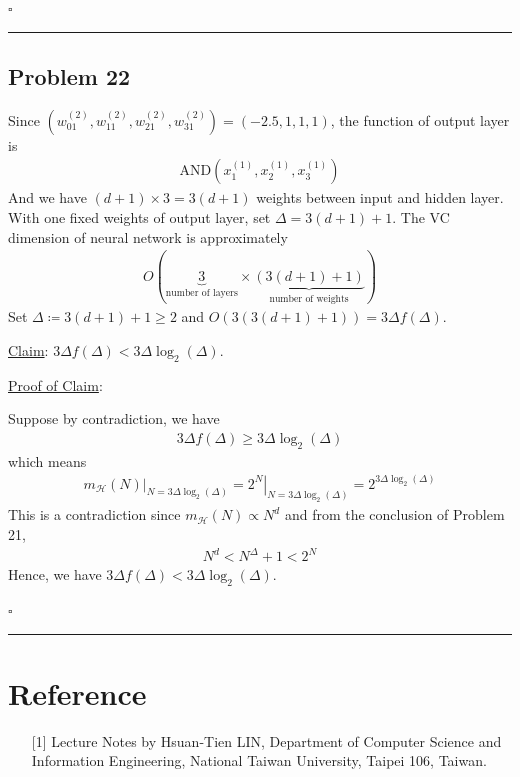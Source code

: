 \documentclass[12pt]{article}
\newcommand*{\QEDB}{\hfill\ensuremath{\square}}
\newcommand{\ParTh}[1]{\left(#1\right)}
\newcommand{\horrule}[1]{\rule{\linewidth}{#1}}
\begin{document}

\QEDB

\horrule{0.5pt}

\subsection*{Problem 22}

Since $\ParTh{w^{\ParTh{2}}_{01},w^{\ParTh{2}}_{11},w^{\ParTh{2}}_{21},w^{\ParTh{2}}_{31}}=\ParTh{-2.5,1,1,1}$, the function of output layer is
\begin{align}
\text{AND}\ParTh{x^{\ParTh{1}}_1,x^{\ParTh{1}}_2,x^{\ParTh{1}}_3}
\end{align}
And we have $\ParTh{d+1}\times3=3\ParTh{d+1}$ weights between input and hidden layer. With one fixed weights of output layer, set $\Delta=3\ParTh{d+1}+1$. The VC dimension of neural network is approximately
\begin{align}
O\ParTh{\underbrace{3}_{\text{number of layers}}\times\underbrace{\ParTh{3\ParTh{d+1}+1}}_{\text{number of weights}}}
\end{align}
Set $\Delta\coloneqq3\ParTh{d+1}+1\geq2$ and $O\ParTh{3\ParTh{3\ParTh{d+1}+1}}=3\Delta f\ParTh{\Delta}$.

\underline{Claim}: $3\Delta f\ParTh{\Delta}<3\Delta\log_2\ParTh{\Delta}$.

\underline{Proof of Claim}:

Suppose by contradiction, we have
\begin{align}
3\Delta f\ParTh{\Delta}\geq3\Delta\log_2\ParTh{\Delta}
\end{align}
which means
\begin{align}
\left.m_{\mathcal{H}}\ParTh{N}\right|_{N=3\Delta\log_2\ParTh{\Delta}}=\left.2^N\right|_{N=3\Delta\log_2\ParTh{\Delta}}=2^{3\Delta\log_2\ParTh{\Delta}}
\end{align}
This is a contradiction since $m_{\mathcal{H}}\ParTh{N}\propto N^d$ and from the conclusion of Problem 21,
\begin{align}
N^d<N^\Delta+1<2^N
\end{align}
Hence, we have $3\Delta f\ParTh{\Delta}<3\Delta\log_2\ParTh{\Delta}$.

\QEDB

\horrule{0.5pt}

\section*{Reference}

\begin{enumerate}

\item[{[1]}] Lecture Notes by Hsuan-Tien LIN, Department of Computer Science and Information Engineering, National Taiwan University, Taipei 106, Taiwan.

\end{enumerate}
\end{document}
